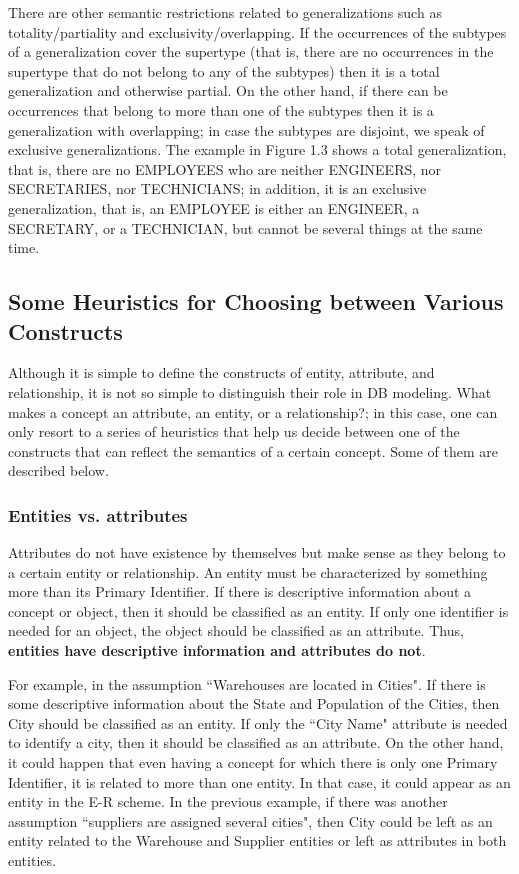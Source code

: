 \documentclass{article}
\begin{document}
There are other semantic restrictions related to generalizations such as totality/partiality and exclusivity/overlapping.  If the occurrences of the subtypes of a generalization cover the supertype (that is, there are no occurrences in the supertype that do not belong to any of the subtypes) then it is a total generalization and otherwise partial.  On the other hand, if there can be occurrences that belong to more than one of the subtypes then it is a generalization with overlapping; in case the subtypes are disjoint, we speak of exclusive generalizations.  The example in Figure 1.3 shows a total generalization, that is, there are no EMPLOYEES who are neither ENGINEERS, nor SECRETARIES, nor TECHNICIANS; in addition, it is an exclusive generalization, that is, an EMPLOYEE is either an ENGINEER, a SECRETARY, or a TECHNICIAN, but cannot be several things at the same time.

\subsection{
Some Heuristics for Choosing between Various Constructs
}

Although it is simple to define the constructs of entity, attribute, and relationship, it is not so simple to distinguish their role in DB modeling.  What makes a concept an attribute, an entity, or a relationship?; in this case, one can only resort to a series of heuristics that help us decide between one of the constructs that can reflect the semantics of a certain concept.  Some of them are described below.

\subsubsection{Entities vs. attributes}

Attributes do not have existence by themselves but make sense as they belong to a certain entity or relationship.  An entity must be characterized by something more than its Primary Identifier.  If there is descriptive information about a concept or object, then it should be classified as an entity.  If only one identifier is needed for an object, the object should be classified as an attribute.  Thus, \textbf{entities have descriptive information and attributes do not}.

For example, in the assumption ``Warehouses are located in Cities".  If there is some descriptive information about the State and Population of the Cities, then City should be classified as an entity.  If only the ``City Name" attribute is needed to identify a city, then it should be classified as an attribute.  On the other hand, it could happen that even having a concept for which there is only one Primary Identifier, it is related to more than one entity.  In that case, it could appear as an entity in the E-R scheme.  In the previous example, if there was another assumption ``suppliers are assigned several cities", then City could be left as an entity related to the Warehouse and Supplier entities or left as attributes in both entities.
\end{document}
